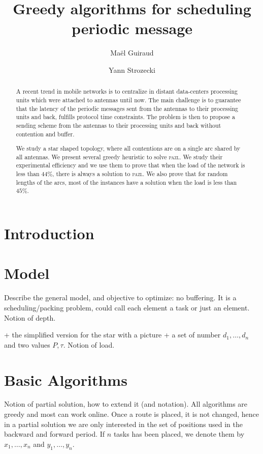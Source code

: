 \documentclass[10pt, conference, letterpaper]{IEEEtran}
\title{Greedy algorithms for scheduling periodic message }
\author[1,2]{Ma\"el Guiraud}
\author[1]{Yann Strozecki}
\affil[1]{David Laboratory, UVSQ}
\affil[2]{Nokia Bell Labs France}
\newcommand\pazl{\textsc{pazl}\xspace}
\begin{document}
\maketitle

\begin{abstract}

A recent trend in mobile networks is to centralize in distant data-centers  processing units which were attached to antennas until now. The main challenge is to guarantee that the latency of the periodic messages sent from the antennas to their processing units and back, fulfills protocol time constraints. The problem is then to propose a sending scheme from the antennas to their processing units and back without contention and buffer.

We study a star shaped topology, where all contentions are on a single arc shared by all antennas. We present several greedy heuristic to solve \pazl. We study their experimental efficiency and we use them to prove that when the load of the network is less than $44\%$, there is always a solution to \pazl. We also prove that for random lengths of the arcs, most of the instances have a solution when the load is less than $45\%$.  
\end{abstract}


\section{Introduction}


\section{Model}
Describe the general model, and objective to optimize: no buffering.
It is a scheduling/packing problem, could call each element a task or just an element. 
Notion of depth.

 + the simplified version for the star with a picture + a set of number $d_1,\dots,d_n$ and two values $P, \tau$. Notion of load.
\cite{Guir1806:Deterministic}


\section{Basic Algorithms}

Notion of partial solution, how to extend it (and notation). All
algorithms are greedy and most can work online. Once a route is placed,
it is not changed, hence in a partial solution we are only interested in the 
set of positions used in the backward and forward period. If $n$ tasks has been
placed, we denote them by $x_1, \dots, x_n$ and $y_1,\dots,y_n$.
\end{document}
